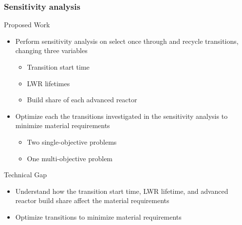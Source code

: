 \begin{frame}
        \frametitle{Sensitivity analysis}
        \begin{block}{Proposed Work}
                \begin{itemize}
                        \item Perform sensitivity analysis on select once through 
                        and recycle transitions, changing three variables
                        \begin{itemize}
                                \item Transition start time
                                \item \gls{LWR} lifetimes
                                \item Build share of each advanced reactor
                        \end{itemize}
                        \item Optimize each the transitions investigated in the 
                                sensitivity analysis to minimize material requirements
                        \begin{itemize}
                                \item Two single-objective problems
                                \item One multi-objective problem
                        \end{itemize}
                \end{itemize}
        \end{block}
        \begin{block}{Technical Gap}
                \begin{itemize}
                        \item Understand how the transition start time, \gls{LWR} 
                                lifetime, and advanced reactor build share
                                affect the material requirements
                        \item Optimize transitions to minimize material requirements
                \end{itemize}
        \end{block}
\end{frame}

